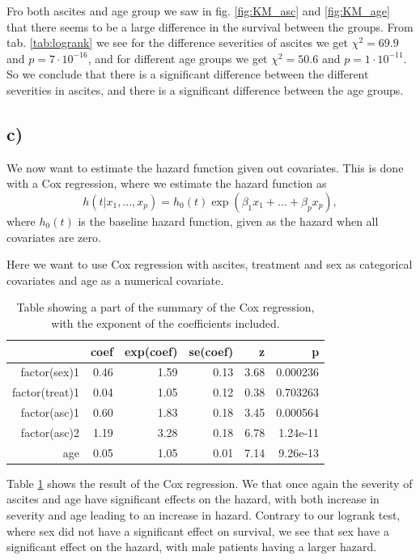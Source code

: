 \documentclass[a4paper,norsk, 10pt]{article}
\begin{document}
Fro both ascites and age group we saw in fig. \ref{fig:KM_asc} and \ref{fig:KM_age} that there seems to be a large difference in the survival between the groups. From tab. \ref{tab:logrank} we see for the difference severities of ascites we get $\chi^2 = 69.9$ and $p=7\cdot10^{-16}$, and for different age groups we get $\chi^2 = 50.6$ and $p=1\cdot10^{-11}$. So we conclude that there is a significant difference between the different severities in ascites, and there is a significant difference between the age groups.


\subsection{c)}
We now want to estimate the hazard function given out covariates. This is done with a Cox regression, where we estimate the hazard function as
\begin{equation}
h(t|x_1,...,x_p) = h_0(t)\exp(\beta_1 x_1 + ... + \beta_p x_p),
\end{equation}
where $h_0(t)$ is the baseline hazard function, given as the hazard when all covariates are zero.

Here we want to use Cox regression with ascites, treatment and sex as categorical covariates and age as a numerical covariate.


\begin{table}[!htb]
\centering
\begin{tabular}{rrrrrr}
  \hline
 & coef & exp(coef) & se(coef) & z & p \\ 
  \hline
factor(sex)1 & 0.46 & 1.59 & 0.13 & 3.68 & 0.000236 \\ 
  factor(treat)1 & 0.04 & 1.05 & 0.12 & 0.38 & 0.703263 \\ 
  factor(asc)1 & 0.60 & 1.83 & 0.18 & 3.45 & 0.000564 \\ 
  factor(asc)2 & 1.19 & 3.28 & 0.18 & 6.78 & 1.24e-11 \\ 
  age & 0.05 & 1.05 & 0.01 & 7.14 & 9.26e-13 \\ 
   \hline
\end{tabular}
\caption{Table showing a part of the summary of the Cox regression, with the exponent of the coefficients included.}\label{tab:cox}
\end{table}

Table \ref{tab:cox} shows the result of the Cox regression. We that once again the severity of ascites and age have significant effects on the hazard, with both increase in severity and age leading to an increase in hazard. Contrary to our logrank test, where sex did not have a significant effect on survival, we see that sex have a significant effect on the hazard, with male patients having a larger hazard.
\end{document}
